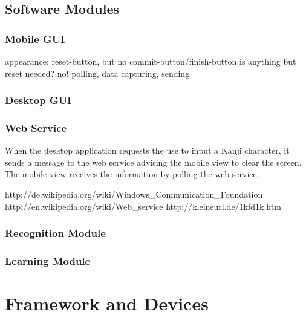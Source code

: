 \subsection{Software Modules}
\label{sec:arch:softwaremodules}

\subsubsection{Mobile GUI}
\label{sec:arch:mobilegui}


appearance: reset-button, but no commit-button/finish-button
is anything but reset needed? no!
polling, 
data capturing, 
sending

\subsubsection{Desktop GUI}
\label{sec:arch:desktopgui}

\subsubsection{Web Service}
\label{sec:arch:webservice}

When the desktop application requests the use to input a Kanji 
character, it sends a message to the web service advising the mobile view to 
clear the screen. The mobile view receives the information by polling the web
service. 

http://de.wikipedia.org/wiki/Windows_Communication_Foundation
http://en.wikipedia.org/wiki/Web_service
http://kleineurl.de/1kfd1k.htm


\subsubsection{Recognition Module}
\label{sec:arch:recognitionmodule}

\subsubsection{Learning Module}
\label{sec:arch:learningmodule}

\section{Framework and Devices}
\label{sec:frameworkanddevices}

